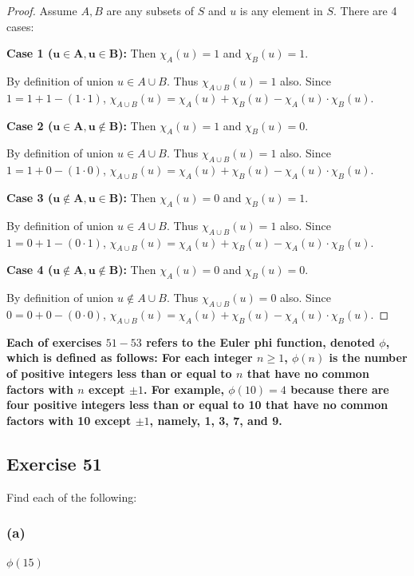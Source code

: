\documentclass[14pt]{extarticle}
\newcommand{\cy}{\color{cyan}}
\begin{document}
\begin{proof}
Assume $A, B$ are any subsets of $S$ and $u$ is any element in $S$. There are 4 cases:

{\bf Case 1 (\(\bm{u \in A, u \in B}\)):} Then \(\chi_A(u) = 1 \) and \(\chi_B(u) = 1\). 

By definition of union \(u \in A \cup B\). Thus
\(\chi_{A \cup B}(u) = 1\) also. 
Since $1 = 1 + 1 - (1 \cdot 1)$, \(\chi_{A \cup B}(u) = \chi_A(u) + \chi_B(u) - \chi_A(u) \cdot \chi_B(u)\).

{\bf Case 2 (\(\bm{u \in A, u \notin B}\)):} Then \(\chi_A(u) = 1\) and \(\chi_B(u) = 0\). 

By definition of union \(u \in A \cup B\). Thus
\(\chi_{A \cup B}(u) = 1\) also. 
Since $1 = 1 + 0 - (1 \cdot 0)$, \(\chi_{A \cup B}(u) = \chi_A(u) + \chi_B(u) - \chi_A(u) \cdot \chi_B(u)\).

{\bf Case 3 (\(\bm{u \notin A, u \in B}\)):} Then \(\chi_A(u) = 0\) and \(\chi_B(u) = 1\). 

By definition of union \(u \in A \cup B\). Thus
\(\chi_{A \cup B}(u) = 1\) also. 
Since $1 = 0 + 1 - (0 \cdot 1)$, \(\chi_{A \cup B}(u) = \chi_A(u) + \chi_B(u) - \chi_A(u) \cdot \chi_B(u)\).

{\bf Case 4 (\(\bm{u \notin A, u \notin B}\)):} Then \(\chi_A(u) = 0 \) and \(\chi_B(u) = 0\). 

By definition of union \(u \notin A \cup B\). Thus
\(\chi_{A \cup B}(u) = 0\) also. 
Since $0 = 0 + 0 - (0 \cdot 0)$, \(\chi_{A \cup B}(u) = \chi_A(u) + \chi_B(u) - \chi_A(u) \cdot \chi_B(u)\).
\end{proof}

{\bf \cy Each of exercises $51-53$ refers to the Euler phi function, denoted $\phi$, which is defined as follows: For 
each integer \(n \geq 1\), $\phi(n)$ is the number of positive integers less than or equal to $n$ that have no 
common factors with $n$ except $\pm 1$. For example, \(\phi(10) = 4\) because there are four positive integers 
less than or equal to 10 that have no common factors with 10 except $\pm 1$, namely, 1, 3, 7, and 9.}

\subsection{Exercise 51}
Find each of the following:

\subsubsection{(a)}
\(\phi(15)\)
\end{document}
